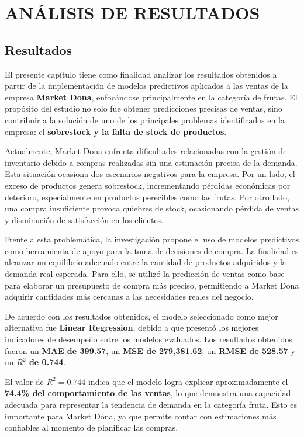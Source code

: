 \chapter{ANÁLISIS DE RESULTADOS}
\section{Resultados}

El presente capítulo tiene como finalidad analizar los resultados obtenidos a partir de la implementación de modelos predictivos aplicados a las ventas de la empresa \textbf{Market Dona}, enfocándose principalmente en la categoría de frutas. El propósito del estudio no solo fue obtener predicciones precisas de ventas, sino contribuir a la solución de uno de los principales problemas identificados en la empresa: el \textbf{sobrestock y la falta de stock de productos}.

Actualmente, Market Dona enfrenta dificultades relacionadas con la gestión de inventario debido a compras realizadas sin una estimación precisa de la demanda. Esta situación ocasiona dos escenarios negativos para la empresa. Por un lado, el exceso de productos genera sobrestock, incrementando pérdidas económicas por deterioro, especialmente en productos perecibles como las frutas. Por otro lado, una compra insuficiente provoca quiebres de stock, ocasionando pérdida de ventas y disminución de satisfacción en los clientes.

Frente a esta problemática, la investigación propone el uso de modelos predictivos como herramienta de apoyo para la toma de decisiones de compra. La finalidad es alcanzar un equilibrio adecuado entre la cantidad de productos adquiridos y la demanda real esperada. Para ello, se utilizó la predicción de ventas como base para elaborar un presupuesto de compra más preciso, permitiendo a Market Dona adquirir cantidades más cercanas a las necesidades reales del negocio.

De acuerdo con los resultados obtenidos, el modelo seleccionado como mejor alternativa fue \textbf{Linear Regression}, debido a que presentó los mejores indicadores de desempeño entre los modelos evaluados. Los resultados obtenidos fueron un \textbf{MAE de 399.57}, un \textbf{MSE de 279,381.62}, un \textbf{RMSE de 528.57} y un \textbf{$R^{2}$ de 0.744}.

El valor de \textbf{$R^{2} = 0.744$} indica que el modelo logra explicar aproximadamente el \textbf{74.4\% del comportamiento de las ventas}, lo que demuestra una capacidad adecuada para representar la tendencia de demanda en la categoría fruta. Esto es importante para Market Dona, ya que permite contar con estimaciones más confiables al momento de planificar las compras.


